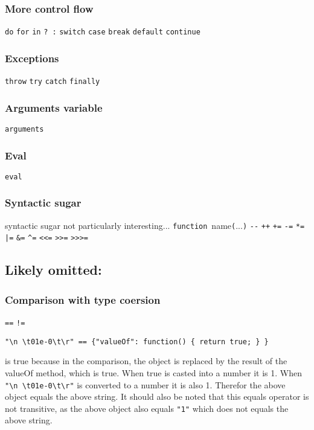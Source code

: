 \subsubsection{More control flow}
\verb|do|
\verb|for|
\verb|in|
\verb|? :|
\verb|switch|
\verb|case|
\verb|break|
\verb|default|
\verb|continue|


\subsubsection{Exceptions}
\verb|throw|
\verb|try|
\verb|catch|
\verb|finally|

\subsubsection{Arguments variable}
\verb|arguments|

\subsubsection{Eval}
\verb|eval|

\subsubsection{Syntactic sugar}
syntactic sugar not particularly interesting...
\verb|function|~name\verb|(|...\verb|)|
\verb|--|
\verb|++|
\verb|+=|
\verb|-=|
\verb|*=|
\verb$|=$
\verb|&=|
\verb|^=|
\verb|<<=|
\verb|>>=|
\verb|>>>=|

\subsection{Likely omitted:}
\subsubsection{Comparison with type coersion}
\verb|==|
\verb|!=|

\begin{verbatim}
"\n \t01e-0\t\r" == {"valueOf": function() { return true; } } 
\end{verbatim}
is true because in the comparison, the object is replaced by the result of the valueOf method, which is true. When true is casted into a number it is 1. When \verb|"\n \t01e-0\t\r"| is converted to a number it is also 1. Therefor the above object equals the above string. It should also be noted that this equals operator is not transitive, as the above object also equals \verb|"1"| which does not equals the above string.

